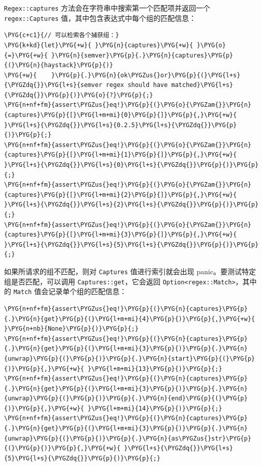 \texttt{Regex::captures} 方法会在字符串中搜索第一个匹配项并返回一个 \texttt{regex::Captures} 值，其中包含表达式中每个组的匹配信息：

\begin{Verbatim}[commandchars=\\\{\},breaklines=true,breakanywhere=true,fontsize=\codefont,xleftmargin=17bp]
\PYG{c+c1}{// 可以检索各个捕获组：}
\PYG{k+kd}{let}\PYG{+w}{ }\PYG{n}{captures}\PYG{+w}{ }\PYG{o}{=}\PYG{+w}{ }\PYG{n}{semver}\PYG{p}{.}\PYG{n}{captures}\PYG{p}{(}\PYG{n}{haystack}\PYG{p}{)}
\PYG{+w}{    }\PYG{p}{.}\PYG{n}{ok\PYGZus{}or}\PYG{p}{(}\PYG{l+s}{\PYGZdq{}}\PYG{l+s}{semver regex should have matched}\PYG{l+s}{\PYGZdq{}}\PYG{p}{)}\PYG{o}{?}\PYG{p}{;}
\PYG{n+nf+fm}{assert\PYGZus{}eq!}\PYG{p}{(}\PYG{o}{\PYGZam{}}\PYG{n}{captures}\PYG{p}{[}\PYG{l+m+mi}{0}\PYG{p}{]}\PYG{p}{,}\PYG{+w}{ }\PYG{l+s}{\PYGZdq{}}\PYG{l+s}{0.2.5}\PYG{l+s}{\PYGZdq{}}\PYG{p}{)}\PYG{p}{;}
\PYG{n+nf+fm}{assert\PYGZus{}eq!}\PYG{p}{(}\PYG{o}{\PYGZam{}}\PYG{n}{captures}\PYG{p}{[}\PYG{l+m+mi}{1}\PYG{p}{]}\PYG{p}{,}\PYG{+w}{ }\PYG{l+s}{\PYGZdq{}}\PYG{l+s}{0}\PYG{l+s}{\PYGZdq{}}\PYG{p}{)}\PYG{p}{;}
\PYG{n+nf+fm}{assert\PYGZus{}eq!}\PYG{p}{(}\PYG{o}{\PYGZam{}}\PYG{n}{captures}\PYG{p}{[}\PYG{l+m+mi}{2}\PYG{p}{]}\PYG{p}{,}\PYG{+w}{ }\PYG{l+s}{\PYGZdq{}}\PYG{l+s}{2}\PYG{l+s}{\PYGZdq{}}\PYG{p}{)}\PYG{p}{;}
\PYG{n+nf+fm}{assert\PYGZus{}eq!}\PYG{p}{(}\PYG{o}{\PYGZam{}}\PYG{n}{captures}\PYG{p}{[}\PYG{l+m+mi}{3}\PYG{p}{]}\PYG{p}{,}\PYG{+w}{ }\PYG{l+s}{\PYGZdq{}}\PYG{l+s}{5}\PYG{l+s}{\PYGZdq{}}\PYG{p}{)}\PYG{p}{;}
\end{Verbatim}

如果所请求的组不匹配，则对 \texttt{Captures} 值进行索引就会出现 panic。要测试特定组是否匹配，可以调用 \texttt{Captures::get}，它会返回 \texttt{Option<regex::Match>}，其中的 \texttt{Match} 值会记录单个组的匹配信息：

\begin{Verbatim}[commandchars=\\\{\},breaklines=true,breakanywhere=true,fontsize=\codefont,xleftmargin=17bp]
\PYG{n+nf+fm}{assert\PYGZus{}eq!}\PYG{p}{(}\PYG{n}{captures}\PYG{p}{.}\PYG{n}{get}\PYG{p}{(}\PYG{l+m+mi}{4}\PYG{p}{)}\PYG{p}{,}\PYG{+w}{ }\PYG{n+nb}{None}\PYG{p}{)}\PYG{p}{;}
\PYG{n+nf+fm}{assert\PYGZus{}eq!}\PYG{p}{(}\PYG{n}{captures}\PYG{p}{.}\PYG{n}{get}\PYG{p}{(}\PYG{l+m+mi}{3}\PYG{p}{)}\PYG{p}{.}\PYG{n}{unwrap}\PYG{p}{(}\PYG{p}{)}\PYG{p}{.}\PYG{n}{start}\PYG{p}{(}\PYG{p}{)}\PYG{p}{,}\PYG{+w}{ }\PYG{l+m+mi}{13}\PYG{p}{)}\PYG{p}{;}
\PYG{n+nf+fm}{assert\PYGZus{}eq!}\PYG{p}{(}\PYG{n}{captures}\PYG{p}{.}\PYG{n}{get}\PYG{p}{(}\PYG{l+m+mi}{3}\PYG{p}{)}\PYG{p}{.}\PYG{n}{unwrap}\PYG{p}{(}\PYG{p}{)}\PYG{p}{.}\PYG{n}{end}\PYG{p}{(}\PYG{p}{)}\PYG{p}{,}\PYG{+w}{ }\PYG{l+m+mi}{14}\PYG{p}{)}\PYG{p}{;}
\PYG{n+nf+fm}{assert\PYGZus{}eq!}\PYG{p}{(}\PYG{n}{captures}\PYG{p}{.}\PYG{n}{get}\PYG{p}{(}\PYG{l+m+mi}{3}\PYG{p}{)}\PYG{p}{.}\PYG{n}{unwrap}\PYG{p}{(}\PYG{p}{)}\PYG{p}{.}\PYG{n}{as\PYGZus{}str}\PYG{p}{(}\PYG{p}{)}\PYG{p}{,}\PYG{+w}{ }\PYG{l+s}{\PYGZdq{}}\PYG{l+s}{5}\PYG{l+s}{\PYGZdq{}}\PYG{p}{)}\PYG{p}{;}
\end{Verbatim}

